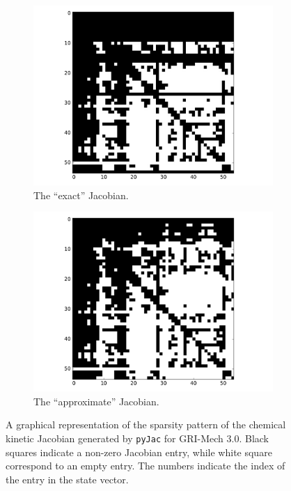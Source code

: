\documentclass[12pt,number,sort&compress,preprint]{elsarticle}
\begin{document}
\begin{figure}[htb]
  \centering
  \begin{subfigure}[t]{0.48\linewidth}
      \includegraphics[width=\textwidth]{ch4_sparsity_exact.pdf}
      \caption{The ``exact'' Jacobian.}
      \label{F:jac_sparse_exact}
  \end{subfigure}
  \hfill
  \begin{subfigure}[t]{0.48\linewidth}
      \includegraphics[width=\textwidth]{ch4_sparsity_approximate.pdf}
      \caption{The ``approximate'' Jacobian.}
      \label{F:jac_sparse_approx}
  \end{subfigure}
  \caption{A graphical representation of the sparsity pattern of the chemical kinetic Jacobian generated by \texttt{pyJac} for GRI-Mech 3.0.
	   Black squares indicate a non-zero Jacobian entry, while white square correspond to an empty entry.
	   The numbers indicate the index of the entry in the state vector.}
  \label{F:jac_sparsity}
\end{figure}
\end{document}

